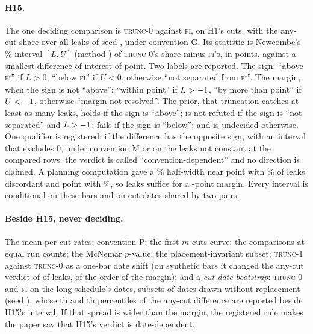 \documentclass[11pt]{article}
\newcommand{\FI}{\textsc{fi}}
\newcommand{\TZ}{\textsc{trunc-0}}
\newcommand{\TO}{\textsc{trunc-1}}
\newcommand{\pct}{\%}
\begin{document}
\paragraph{H15.} The one deciding comparison is \TZ{} against \FI, on H1's \NumHoneCutsN{} cuts,
with the any-cut share over all \NumPopN{} leaks of seed \NumConfSeed, under convention G. Its
statistic is Newcombe's \NumConf\pct{} interval $[L, U]$ (method \NumNewcombeMethod) of \TZ's share
minus \FI's, in points, against a smallest difference of interest of \NumHfifteenMargin{} point.
Two labels are reported. The sign: ``above \FI'' if $L>0$, ``below \FI'' if $U<0$, otherwise ``not
separated from \FI''. The margin, when the sign is not ``above'': ``within \NumHfifteenMargin{}
point'' if $L > -1$, ``by more than \NumHfifteenMargin{} point'' if
$U < -1$, otherwise ``margin not resolved''. The prior, that truncation catches at
least as many leaks, holds if the sign is ``above''; is not refuted if the sign is ``not separated''
and $L > -1$; fails if the sign is ``below''; and is undecided otherwise. One
qualifier is registered: if the difference has the opposite sign, with an interval that excludes 0,
under convention M or on the leaks not constant at the compared rows, the verdict is called
``convention-dependent'' and no direction is claimed. A planning computation gave a
\NumConf\pct{} half-width near \NumPowHalfA{} point with \NumPowDiscA\pct{} of leaks discordant and
\NumPowHalfB{} point with \NumPowDiscB\pct{}, so \NumPopN{} leaks suffice for a
\NumHfifteenMargin-point margin. Every interval is conditional on these bars and on
\NumCutDates{} cut dates shared by two pairs.

\paragraph{Beside H15, never deciding.} The mean per-cut rates; convention P; the first-$m$-cuts
curve; the comparisons at equal run counts; the McNemar $p$-value; the placement-invariant subset;
\TO{} against \TZ{} as a one-bar date shift (on synthetic bars it changed the any-cut verdict of
\NumShiftChanged{} of \NumShiftOf{} leaks, of the order of the margin); and a \emph{cut-date
bootstrap}: \TZ{} and \FI{} on the long schedule's \NumLongPerPair{} dates, \NumBootSubsets{} subsets
of \NumBootDates{} dates drawn without replacement (seed \NumBootSeed), whose \NumBootPLo th and
\NumBootPHi th percentiles of the any-cut difference are reported beside H15's interval. If that
spread is wider than the margin, the registered rule makes the paper say that H15's verdict is
date-dependent.
\end{document}
